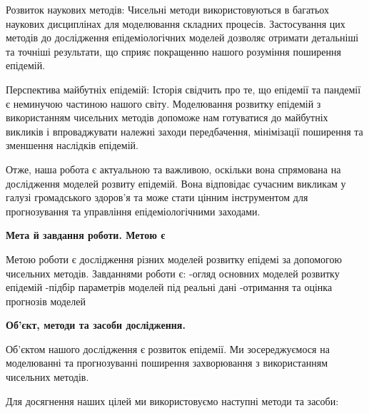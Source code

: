     Розвиток наукових методів: Чисельні методи використовуються в багатьох наукових дисциплінах для моделювання складних процесів. Застосування цих методів до дослідження епідеміологічних моделей дозволяє отримати детальніші та точніші результати, що сприяє покращенню нашого розуміння поширення епідемій.

    Перспектива майбутніх епідемій: Історія свідчить про те, що епідемії та пандемії є неминучою частиною нашого світу. Моделювання розвитку епідемій з використанням чисельних методів допоможе нам готуватися до майбутніх викликів і впроваджувати належні заходи передбачення, мінімізації поширення та зменшення наслідків епідемій.

Отже, наша робота є актуальною та важливою, оскільки вона спрямована на дослідження моделей розвиту епідемій. Вона відповідає сучасним викликам у галузі громадського здоров'я та може стати цінним інструментом для прогнозування та управління епідеміологічними заходами.

\textbf{Мета й завдання роботи. Метою є}

Метою роботи є дослідження різних моделей розвитку епідемі за допомогою 
чисельних методів. 
Завданнями роботи є:
    -огляд основних моделей розвитку епідемій
    -підбір параметрів моделей під реальні дані
    -отримання та оцінка прогнозів моделей


\textbf{Об'єкт, методи та засоби дослідження.}

Об'єктом нашого дослідження є розвиток епідемії. Ми зосереджуємося на моделюванні та прогнозуванні поширення захворювання з використанням чисельних методів.

Для досягнення наших цілей ми використовуємо наступні методи та засоби:

